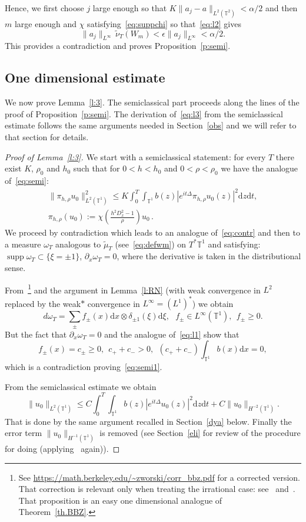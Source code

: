 \documentclass[AHL, Unicode, longabstracts]{cedram}
\DeclareMathOperator{\supp}{supp}
\newcommand{\TT}{{\mathbb T}}
\newcommand{\TT}{{\mathbb T}}
\newcommand*{\dd}{\mathrm{d}}
\newcommand*{\dx}{\dd x}
\newcommand*{\dz}{\dd z}
\newcommand*{\dt}{\dd t}
\newcommand*{\dxi}{\dd \xi}
\begin{document}
Hence, we first choose $ j $ large enough so that $ K \| a_j - a \|_{L^2 (\TT^2) } < \alpha/2 $ and then $ m $ large enough and $ \chi $ satisfying~\eqref{eq:suppchi} so that~\eqref{eq:l2} gives
\[
\| a_j \|_{ L^\infty } \, \widetilde \nu_T (W_m) <
\epsilon \| a_j \|_{ L^\infty } < \alpha/2.
\]
This provides a contradiction and proves Proposition~\ref{p:semi}.

\subsection{One dimensional estimate}\label{1D}

We now prove Lemma~\ref{l:3}. The semiclassical part proceeds along the lines of the proof of Proposition~\ref{p:semi}. The derivation of~\eqref{eq:l3} from the semiclassical estimate follows the same arguments needed in Section~\ref{obs} and we will refer to that section for details.

\begin{proof}[Proof of Lemma~\ref{l:3}]
We start with a semiclassical statement: for every $ T $ there exist $ K$, $ \rho_0 $ and $ h_0 $ such that for $ 0 < h < h_0 $ and $ 0 < \rho < \rho_0 $ we have the analogue of~\eqref{eq:semi}:
\begin{multline}\label{eq:semi1}
\| \pi_{h, \rho} u_0 \|_{ L^2 (\TT^1) }^2 \leq K \int_0^T \!\!\int_{ \TT^1}b (z) | e^{ i t \Delta} \pi_{h, \rho} u_0 (z) |^2 \dz \dt,
\\
\pi_{h, \rho} (u_0) := \chi \left(\frac{ h^2 D_x^2 - 1} {\rho} \right) u_0 \,.
\end{multline}
We proceed by contradiction which leads to an analogue of~\eqref{eq:contr} and then to a measure $ \omega_T $ analogous to $ \widetilde \mu_T $ (see~\eqref{eq:defwm}) on $ T^* \TT^1 $ and satisfying: $ \supp \omega_T \subset \{ \xi = \pm 1 \} $, $\partial_x \omega_T = 0$, where the derivative is taken in the distributional sense.

From~\cite[Proposition~2.1]{BBZ}\footnote{See \url{https://math.berkeley.edu/~zworski/corr_bbz.pdf} for a corrected version. That correction is relevant only when treating the irrational case: see~\cite{BZ4} and~\cite{BBZ}. That proposition is an easy one dimensional analogue of Theorem~\ref{th.BBZ}.} and the argument in Lemma~\ref{l:RN} (with weak convergence in $L^2 $ replaced by the weak$*$ convergence in $ L^\infty = (L^1)^* $) we obtain
\[
d \omega_T = \sum_{ \pm } f_\pm (x) \dx \otimes \delta_{\pm 1} (\xi) \dxi, \ \ \ f_\pm \in L^\infty (\TT^1), \ \ f_\pm \geq 0.
\]
But the fact that $ \partial_x \omega_T = 0 $ and the analogue of~\eqref{eq:l1} show that
\[
f_\pm (x) = c_\pm \geq 0, \ \ c_+ + c_- > 0, \ \ (c_+ + c_-)\int _{\TT^1 } b (x) \dx = 0,
\]
which is a contradiction proving~\eqref{eq:semi1}.

From the semiclassical estimate we obtain
\[
\| u_0\|_{L^2 (\TT^1) } \leq C
\int_0^T \!\!\int_{ \TT^1}b (z) | e^{ i t \Delta} u_0 (z) |^2 \dz \dt + C \| u_0 \|_{ H^{-2}(\TT^1)}.
\]
That is done by the same argument recalled in Section~\ref{dya} below. Finally the error term $ \| u_0 \|_{ H^{-1}(\TT^1) } $ is removed (see Section~\ref{eli} for review of the procedure for doing (applying~\cite[Proposition~2.1]{BBZ} again)).
\end{proof}
\end{document}
